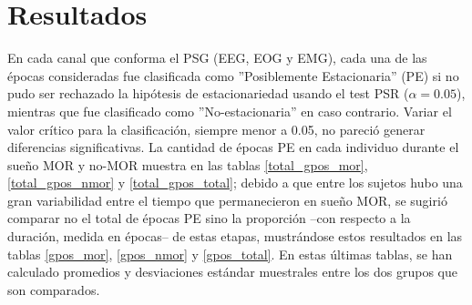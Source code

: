 \chapter{Resultados}

En cada canal que conforma el PSG (EEG, EOG y EMG), 
cada una de las \'epocas consideradas fue clasificada como 
''Posiblemente Estacionaria'' (PE) si no pudo ser rechazado la hip\'otesis de 
estacionariedad usando el test PSR ($\alpha = 0.05$), mientras que 
fue clasificado como ''No-estacionaria'' en caso contrario. Variar el valor cr\'itico
para la clasificaci\'on, siempre menor a 0.05, no pareci\'o generar diferencias significativas.
La cantidad de \'epocas PE en cada individuo 
durante el sue\~no MOR y no-MOR
muestra en las tablas \ref{total_gpos_mor}, \ref{total_gpos_nmor} y
\ref{total_gpos_total}; debido a que entre los sujetos hubo una gran variabilidad entre el tiempo 
que permanecieron en sue\~no MOR, se sugiri\'o comparar no el total de \'epocas PE sino
la proporci\'on --con respecto a la duraci\'on, medida en \'epocas-- de estas etapas, 
mustr\'andose estos resultados en las tablas \ref{gpos_mor}, \ref{gpos_nmor} y
\ref{gpos_total}. En estas \'ultimas tablas, se han calculado promedios y desviaciones
est\'andar muestrales entre los dos grupos que son comparados.


